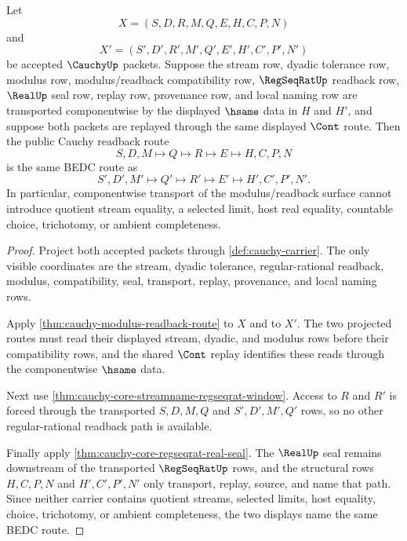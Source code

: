 \begin{theorem}
\label{thm:cauchy-core-modulus-transport-stability}
Let
$$
X=(S,D,R,M,Q,E,H,C,P,N)
$$
and
$$
X'=(S',D',R',M',Q',E',H',C',P',N')
$$
be accepted $\CauchyUp$ packets. Suppose the stream row, dyadic tolerance row, modulus row, modulus/readback compatibility row, $\RegSeqRatUp$ readback row, $\RealUp$ seal row, replay row, provenance row, and local naming row are transported componentwise by the displayed $\hsame$ data in $H$ and $H'$, and suppose both packets are replayed through the same displayed $\Cont$ route. Then the public Cauchy readback route
$$
S,D,M \longmapsto Q \longmapsto R \longmapsto E \longmapsto H,C,P,N
$$
is the same BEDC route as
$$
S',D',M' \longmapsto Q' \longmapsto R' \longmapsto E' \longmapsto H',C',P',N' .
$$
In particular, componentwise transport of the modulus/readback surface cannot introduce quotient stream equality, a selected limit, host real equality, countable choice, trichotomy, or ambient completeness.
\end{theorem}
\begin{proof}
Project both accepted packets through \autoref{def:cauchy-carrier}. The only visible coordinates are the stream, dyadic tolerance, regular-rational readback, modulus, compatibility, seal, transport, replay, provenance, and local naming rows.

Apply \autoref{thm:cauchy-modulus-readback-route} to $X$ and to $X'$. The two projected routes must read their displayed stream, dyadic, and modulus rows before their compatibility rows, and the shared $\Cont$ replay identifies these reads through the componentwise $\hsame$ data.

Next use \autoref{thm:cauchy-core-streamname-regseqrat-window}. Access to $R$ and $R'$ is forced through the transported $S,D,M,Q$ and $S',D',M',Q'$ rows, so no other regular-rational readback path is available.

Finally apply \autoref{thm:cauchy-core-regseqrat-real-seal}. The $\RealUp$ seal remains downstream of the transported $\RegSeqRatUp$ rows, and the structural rows $H,C,P,N$ and $H',C',P',N'$ only transport, replay, source, and name that path. Since neither carrier contains quotient streams, selected limits, host equality, choice, trichotomy, or ambient completeness, the two displays name the same BEDC route.
\end{proof}

